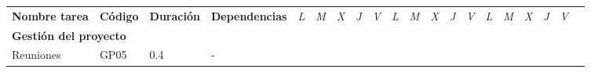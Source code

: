 \begin{longtable}[c]{llclllllllllllllllll}
        \multicolumn{1}{|c|}{\multirow{-2}{*}{\textbf{Nombre tarea}}}                                                           & \multicolumn{1}{c|}{\multirow{-2}{*}{\textbf{Código}}}                         & \multicolumn{1}{c|}{\multirow{-2}{*}{\textbf{Duración}}}                         & \multicolumn{1}{c|}{\multirow{-2}{*}{\textbf{Dependencias}}}                         & \multicolumn{1}{l|}{\textit{L}} & \multicolumn{1}{l|}{\textit{M}} & \multicolumn{1}{l|}{\textit{X}} & \multicolumn{1}{l|}{\textit{J}} & \multicolumn{1}{l|}{\textit{V}} & \multicolumn{1}{l|}{\textit{L}} & \multicolumn{1}{l|}{\textit{M}} & \multicolumn{1}{l|}{\textit{X}} & \multicolumn{1}{l|}{\textit{J}} & \multicolumn{1}{l|}{\textit{V}} & \multicolumn{1}{l|}{\textit{L}} & \multicolumn{1}{l|}{\textit{M}} & \multicolumn{1}{l|}{\textit{X}} & \multicolumn{1}{l|}{\textit{J}} & \multicolumn{1}{l|}{\textit{V}}               &  \\ \cline{1-19}
        \multicolumn{4}{|l|}{\textbf{Gestión del proyecto}}                                                                                                                                                                                                                                                                                                                                & \multicolumn{15}{l|}{}                                                                                                                                                                                                                                                                                                                                                                                                                                                                                                                    &  \\ \cline{1-19}
        \multicolumn{1}{|l|}{Reuniones}                                                                                         & \multicolumn{1}{l|}{GP05}                                                      & \multicolumn{1}{l|}{0.4}                                                         & \multicolumn{1}{l|}{-}                                                               &                                 &                                 &                                 & \cellcolor[HTML]{EF8787}        &                                 &                                 &                                 &                                 &                                 &                                 &                                 &                                 &                                 & \cellcolor[HTML]{EF8787}        & \multicolumn{1}{l|}{}                         &  \\ \cline{1-4}

\end{longtable}
